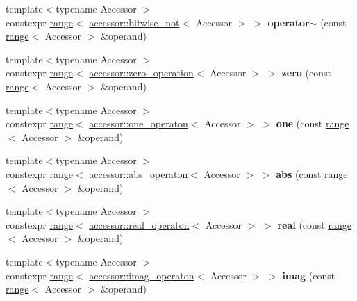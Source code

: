 \begin{DoxyCompactItemize}
{\footnotesize template$<$typename Accessor $>$ }\\constexpr \hyperlink{classgko_1_1range}{range}$<$ \hyperlink{structgko_1_1accessor_1_1bitwise__not}{accessor\+::bitwise\+\_\+not}$<$ Accessor $>$ $>$ {\bfseries operator$\sim$} (const \hyperlink{classgko_1_1range}{range}$<$ Accessor $>$ \&operand)
\item 
\mbox{\label{namespacegko_ae6313c0993fea961ebefddb393ab937d}} 
{\footnotesize template$<$typename Accessor $>$ }\\constexpr \hyperlink{classgko_1_1range}{range}$<$ \hyperlink{structgko_1_1accessor_1_1zero__operation}{accessor\+::zero\+\_\+operation}$<$ Accessor $>$ $>$ {\bfseries zero} (const \hyperlink{classgko_1_1range}{range}$<$ Accessor $>$ \&operand)
\item 
\mbox{\label{namespacegko_a314483c618b92c78dc6ac2e978ad4529}} 
{\footnotesize template$<$typename Accessor $>$ }\\constexpr \hyperlink{classgko_1_1range}{range}$<$ \hyperlink{structgko_1_1accessor_1_1one__operaton}{accessor\+::one\+\_\+operaton}$<$ Accessor $>$ $>$ {\bfseries one} (const \hyperlink{classgko_1_1range}{range}$<$ Accessor $>$ \&operand)
\item 
\mbox{\label{namespacegko_a1affadd93ed2a2b867d5aeff319e8922}} 
{\footnotesize template$<$typename Accessor $>$ }\\constexpr \hyperlink{classgko_1_1range}{range}$<$ \hyperlink{structgko_1_1accessor_1_1abs__operaton}{accessor\+::abs\+\_\+operaton}$<$ Accessor $>$ $>$ {\bfseries abs} (const \hyperlink{classgko_1_1range}{range}$<$ Accessor $>$ \&operand)
\item 
\mbox{\label{namespacegko_ac1abf93b0d48330b1d2dad93a30f7a67}} 
{\footnotesize template$<$typename Accessor $>$ }\\constexpr \hyperlink{classgko_1_1range}{range}$<$ \hyperlink{structgko_1_1accessor_1_1real__operaton}{accessor\+::real\+\_\+operaton}$<$ Accessor $>$ $>$ {\bfseries real} (const \hyperlink{classgko_1_1range}{range}$<$ Accessor $>$ \&operand)
\item 
\mbox{\label{namespacegko_ae11c76be937a8bf8393f4c1c27702dc0}} 
{\footnotesize template$<$typename Accessor $>$ }\\constexpr \hyperlink{classgko_1_1range}{range}$<$ \hyperlink{structgko_1_1accessor_1_1imag__operaton}{accessor\+::imag\+\_\+operaton}$<$ Accessor $>$ $>$ {\bfseries imag} (const \hyperlink{classgko_1_1range}{range}$<$ Accessor $>$ \&operand)

\end{DoxyCompactItemize}
